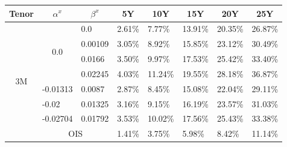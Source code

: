 \documentclass[12pt]{article}
\begin{document}
\begin{table}[H]
    \centering
    \begin{tabular}{|c||c||c||c|c|c|c|c|} \hline
    Tenor               & $\alpha^x$          & $\beta^x$                               &  5Y                      & 10Y                      & 15Y                     & 20Y                   & 25Y   \\ \hline \hline
    \multirow{8}{*}{3M} & \multirow{4}{*}{0.0}  & \multicolumn{1}{l||}{0.0}             & \multicolumn{1}{l|}{2.61\%}    & \multicolumn{1}{l|}{7.77\%}      & \multicolumn{1}{l|}{13.91\%} & \multicolumn{1}{l|}{20.35\%} & \multicolumn{1}{l|}{26.87\%}\\\cline{3-8}
                        &                          & \multicolumn{1}{l||}{0.00109}      & \multicolumn{1}{l|}{3.05\%} & \multicolumn{1}{l|}{8.92\%}     & \multicolumn{1}{l|}{15.85\%} & \multicolumn{1}{l|}{23.12\%} & \multicolumn{1}{l|}{30.49\%}\\\cline{3-8}
                        &                          & \multicolumn{1}{l||}{0.0166}       & \multicolumn{1}{l|}{3.50\%} & \multicolumn{1}{l|}{9.97\%}      & \multicolumn{1}{l|}{17.53\%} & \multicolumn{1}{l|}{25.42\%} & \multicolumn{1}{l|}{33.40\%}\\\cline{3-8}
                        &                          & \multicolumn{1}{l||}{0.02245}      & \multicolumn{1}{l|}{4.03\%} & \multicolumn{1}{l|}{11.24\%}      & \multicolumn{1}{l|}{19.55\%} & \multicolumn{1}{l|}{28.18\%} & \multicolumn{1}{l|}{36.87\%}\\\cline{2-8}
                        & \multicolumn{1}{l||}{-0.01313} & \multicolumn{1}{l||}{0.0087}  & \multicolumn{1}{l|}{2.87\%}    & \multicolumn{1}{l|}{8.45\%} & \multicolumn{1}{l|}{15.08\%} & \multicolumn{1}{l|}{22.04\%}& \multicolumn{1}{l|}{29.11\%} \\\cline{2-8}
                        & \multicolumn{1}{l||}{-0.02} & \multicolumn{1}{l||}{0.01325}    & \multicolumn{1}{l|}{3.16\%}     & \multicolumn{1}{l|}{9.15\%} & \multicolumn{1}{l|}{16.19\%} & \multicolumn{1}{l|}{23.57\%}& \multicolumn{1}{l|}{31.03\%} \\\cline{2-8}
                        & \multicolumn{1}{l||}{-0.02704} & \multicolumn{1}{l||}{0.01792}  & \multicolumn{1}{l|}{3.53\%}     & \multicolumn{1}{l|}{10.02\%} & \multicolumn{1}{l|}{17.56\%} & \multicolumn{1}{l|}{25.43\%}& \multicolumn{1}{l|}{33.38\%} \\\cline{2-8}
                        &  \multicolumn{2}{|c||}{OIS}                                   &  \multicolumn{1}{l|}{1.41\%} & \multicolumn{1}{l|}{3.75\%}      & \multicolumn{1}{l|}{5.98\%} & \multicolumn{1}{l|}{8.42\%} & \multicolumn{1}{l|}{11.14\%}\\ \hline \hline

\end{tabular}
\end{table}
\end{document}
